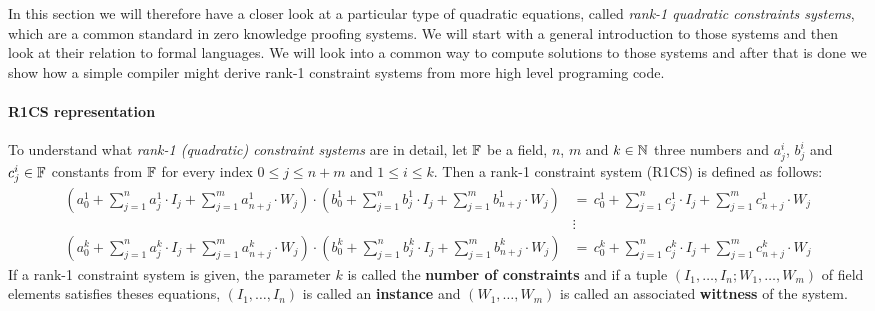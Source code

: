 In this section we will therefore have a closer look at a particular type of quadratic equations, called \textit{rank-1 quadratic constraints systems}, which are a common standard in zero knowledge proofing systems. We will start with a general introduction to those systems and then look at their relation to formal languages. We will look into a common way to compute solutions to those systems and after that is done we show how a simple compiler might derive rank-1 constraint systems from more high level programing code. 

\paragraph{R1CS representation} To understand what \textit{rank-1 (quadratic) constraint systems} are in detail, let $\mathbb{F}$ be a field, $n$, $m$ and $k\in\mathbb{N}$ three numbers and $a_j^i$, $b_j^i$ and $c_j^i\in\mathbb{F}$ constants from $\mathbb{F}$ for every index $0\leq j \leq n+m$ and $1\leq i \leq k$. Then a rank-1 constraint system (R1CS) is defined as follows: 
\begin{align*}
\scriptstyle\left(a^1_0 + \sum_{j=1}^n a^1_j \cdot I_j + \sum_{j=1}^m a^1_{n+j} \cdot W_j  \right) \cdot 
\left(b^1_0 + \sum_{j=1}^n b^1_j \cdot I_j + \sum_{j=1}^m b^1_{n+j} \cdot W_j  \right) &=\, 
\scriptstyle c^1_0 + \sum_{j=1}^n c^1_j \cdot I_j + \sum_{j=1}^m c^1_{n+j} \cdot W_j\\
       & \vdots\\
\scriptstyle\left(a^k_0 + \sum_{j=1}^n a^k_j \cdot I_j + \sum_{j=1}^m a^k_{n+j} \cdot W_j  \right) \cdot 
\left(b^k_0 + \sum_{j=1}^n b^k_j \cdot I_j + \sum_{j=1}^m b^k_{n+j} \cdot W_j  \right) &=\, 
\scriptstyle c^k_0 + \sum_{j=1}^n c^k_j \cdot I_j + \sum_{j=1}^m c^k_{n+j} \cdot W_j       
\end{align*}
If a rank-1 constraint system is given, the parameter $k$ is called the \textbf{number of constraints} and if a tuple $(I_1,\ldots, I_n; W_1,\ldots,W_m)$ of field elements satisfies theses equations, $(I_1,\ldots, I_n)$ is called an \textbf{instance} and $(W_1,\ldots,W_m)$ is called an associated \textbf{wittness} of the system.

